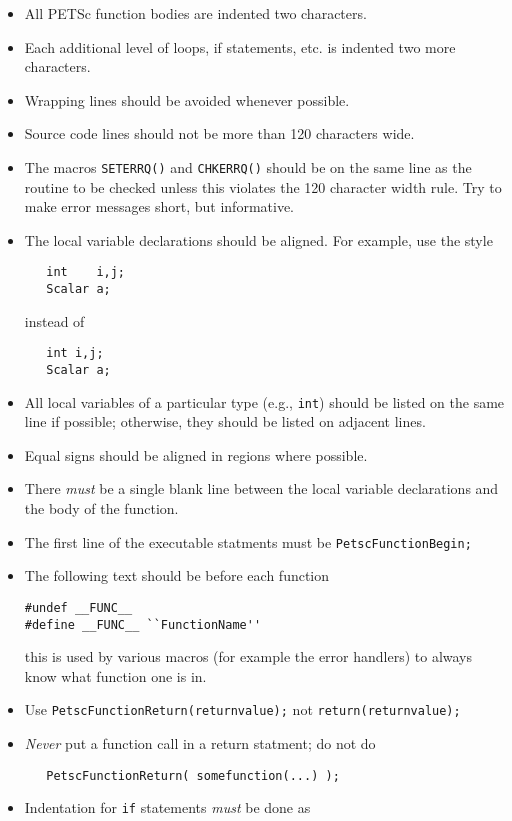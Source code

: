 \documentclass[twoside,12pt]{../sty/report_petsc}
\begin{document}
\begin{itemize}
\item All PETSc function bodies are indented two characters.
\item Each additional level of loops, if statements, etc. is indented
      two more characters.
\item Wrapping lines should be avoided whenever possible.
\item Source code lines should not be more than 120 characters wide.
\item The macros {\tt SETERRQ()} and {\tt CHKERRQ()} should be on the 
      same line as the routine to be checked unless this violates the 
      120 character width rule. Try to make error messages short, but 
      informative.
\item The local variable declarations should be aligned. For example,
      use the style
\begin{verbatim}
   int    i,j;
   Scalar a;
\end{verbatim}
instead of
\begin{verbatim}
   int i,j;
   Scalar a;
\end{verbatim}
\item All local variables of a particular type (e.g., {\tt int}) should be 
      listed on the same line if possible; otherwise, they should be listed
      on adjacent lines.
\item Equal signs should be aligned in regions where possible.
\item There {\em must} be a single blank line
      between the local variable declarations and the body of the function.
\item The first line of the executable statments must be {\tt PetscFunctionBegin;}
\item The following text should be before each function
\begin{verbatim}
#undef __FUNC__
#define __FUNC__ ``FunctionName''
\end{verbatim}
this is used by various macros (for example the error handlers) to always know
what function one is in.
\item Use {\tt PetscFunctionReturn(returnvalue);} not {\tt return(returnvalue);}
\item {\em Never} put a function call in a return statment; do not do
\begin{verbatim}
   PetscFunctionReturn( somefunction(...) );
\end{verbatim}
\item Indentation for {\tt if} statements {\em must}  be done  as

\end{itemize}
\end{document}
